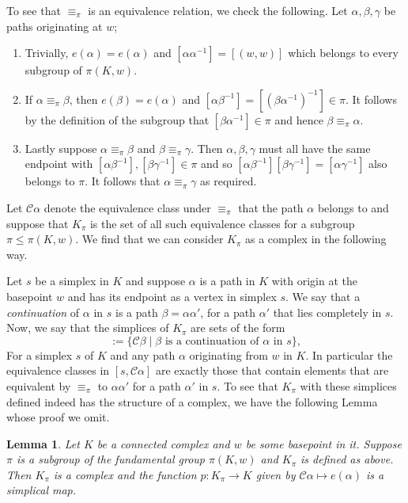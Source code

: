 \documentclass[12pt]{article}
\newtheorem{lemma}{Lemma}
\theoremstyle{definition}
\numberwithin{equation}{theorem}
\begin{document}
To see that $\equiv_{\pi}$ is an equivalence relation, we check the following. Let $\alpha,\beta,\gamma$ be paths originating at $w$;
\begin{enumerate}
\item Trivially, $e(\alpha) = e(\alpha)$ and $[\alpha \alpha^{-1}] = [(w,w)]$ which belongs to every subgroup of $\pi(K,w)$.
\item If $\alpha \equiv_{\pi} \beta$, then $e(\beta) = e(\alpha)$ and $[\alpha \beta^{-1}] = [(\beta \alpha^{-1})^{-1}] \in \pi$. It follows by the definition of the subgroup that $[\beta \alpha^{-1}] \in \pi$ and hence $\beta \equiv_{\pi} \alpha$.
\item Lastly suppose $\alpha \equiv_{\pi} \beta$ and $\beta \equiv_{\pi} \gamma$. Then $\alpha,\beta,\gamma$ must all have the same endpoint with $[\alpha\beta^{-1}],[\beta\gamma^{-1}] \in \pi$ and so $[\alpha\beta^{-1}][\beta\gamma^{-1}] = [\alpha\gamma^{-1}]$ also belongs to $\pi$. It follows that $\alpha \equiv_{\pi} \gamma$ as required.
\end{enumerate}

Let \emph{$\mathcal{C}\alpha$} denote the equivalence class under $\equiv_{\pi}$ that the path $\alpha$ belongs to and suppose that $K_{\pi}$ is the set of all such equivalence classes for a subgroup $\pi \leq \pi(K,w)$. We find that we can consider $K_{\pi}$ as a complex in the following way.

Let $s$ be a simplex in $K$ and suppose $\alpha$ is a path in $K$ with origin at the basepoint $w$ and has its endpoint as a vertex in simplex $s$. We say that a \emph{continuation} of $\alpha$ in $s$ is a path $\beta = \alpha\alpha'$, for a path $\alpha'$ that lies completely in $s$. Now, we say that the simplices of $K_{\pi}$ are sets of the form
\begin{equation*}
  [s,\mathcal{C}\alpha] := \{\mathcal{C}\beta \mid \beta \text{ is a continuation of } \alpha \text{ in } s \},
\end{equation*}
For a simplex $s$ of $K$ and any path $\alpha$ originating from $w$ in $K$. In particular the equivalence classes in $[s,\mathcal{C}\alpha]$ are exactly those that contain elements that are equivalent by $\equiv_{\pi}$ to $\alpha\alpha'$ for a path $\alpha'$ in $s$. To see that $K_{\pi}$ with these simplices defined indeed has the structure of a complex, we have the following Lemma whose proof we omit.

\begin{lemma}
  \label{lem:pip}
  Let $K$ be a connected complex and $w$ be some basepoint in it. Suppose $\pi$ is a subgroup of the fundamental group $\pi(K,w)$ and $K_{\pi}$ is defined as above. Then $K_{\pi}$ is a complex and the function $p:K_{\pi} \rightarrow K$ given by $\mathcal{C}\alpha \mapsto e(\alpha)$ is a simplical map.
\end{lemma}
\end{document}
